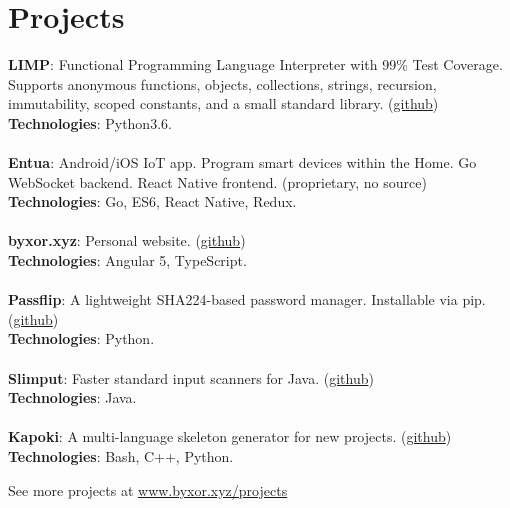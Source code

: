 \documentclass{article}
\newcommand{\yourlight}[1]{\textcolor{gray}{#1}}
\begin{document}
\section{Projects}
\begin{multicols}{2}
\textbf{LIMP}: Functional Programming Language Interpreter with 99\% Test Coverage. Supports anonymous functions, objects, collections, strings, recursion, immutability, scoped constants, and a small standard library. (\href{http://www.github.com/byxor/limp}{github})\\\textbf{Technologies}: Python3.6.\vspace{0.5em}\\\yourlight{\hdashrule{\linewidth}{1pt}{2pt}}\vspace{0.5em}\\\textbf{Entua}: Android/iOS IoT app. Program smart devices within the Home. Go WebSocket backend. React Native frontend. (proprietary, no source)\\\textbf{Technologies}: Go, ES6, React Native, Redux.\vspace{0.5em}\\\yourlight{\hdashrule{\linewidth}{1pt}{2pt}}\vspace{0.5em}\\\textbf{byxor.xyz}: Personal website. (\href{http://www.github.com/byxor/website}{github})\\\textbf{Technologies}: Angular 5, TypeScript.\vspace{0.5em}\\\yourlight{\hdashrule{\linewidth}{1pt}{2pt}}\vspace{0.5em}\\\textbf{Passflip}: A lightweight SHA224-based password manager. Installable via pip. (\href{http://www.github.com/byxor/passflip}{github})\\\textbf{Technologies}: Python.\vspace{0.5em}\\\yourlight{\hdashrule{\linewidth}{1pt}{2pt}}\vspace{0.5em}\\\textbf{Slimput}: Faster standard input scanners for Java. (\href{http://www.github.com/byxor/slimput}{github})\\\textbf{Technologies}: Java.\vspace{0.5em}\\\yourlight{\hdashrule{\linewidth}{1pt}{2pt}}\vspace{0.5em}\\\textbf{Kapoki}: A multi-language skeleton generator for new projects. (\href{http://www.github.com/byxor/kapoki}{github})\\\textbf{Technologies}: Bash, C++, Python.
\end{multicols}
\begin{center}
 See more projects at \url{www.byxor.xyz/projects}
\end{center}
\end{document}
